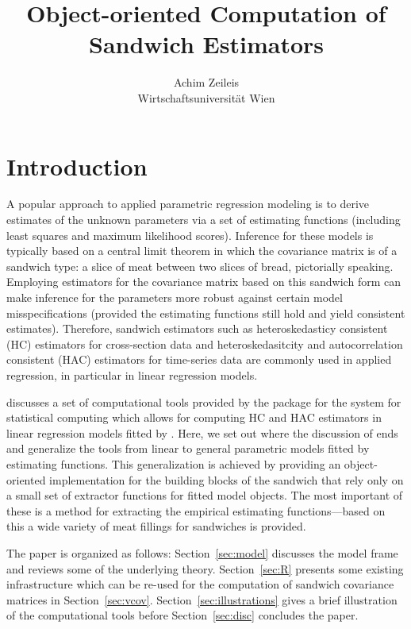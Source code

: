 \documentclass{Z}
\author{Achim Zeileis\\Wirtschaftsuniversit\"at Wien}
\title{Object-oriented Computation of Sandwich Estimators}
\begin{document}


\section{Introduction} \label{sec:intro}

A popular approach to applied parametric regression modeling is to derive estimates
of the unknown parameters via a set of estimating functions (including least squares
and maximum likelihood scores). Inference for these models is typically based on a
central limit theorem in which the covariance matrix is of a sandwich type: a slice
of meat between two slices of bread, pictorially speaking. Employing estimators
for the covariance matrix based on this sandwich form can make inference for the parameters
more robust against certain model misspecifications (provided the estimating
functions still hold and yield consistent estimates). Therefore, sandwich estimators
such as heteroskedasticy consistent (HC) estimators for cross-section data and
heteroskedasitcity and autocorrelation consistent (HAC) estimators for time-series data 
are commonly used in applied regression, in particular in linear regression models.

\cite{hac:Zeileis:2004a} discusses a set of computational tools provided by the
 package for the  system for statistical computing \citep{hac:R:2006}
which allows for computing HC and HAC estimators in linear regression models fitted 
by . Here, we set out where the discussion of \cite{hac:Zeileis:2004a} ends
and generalize the tools from linear to general parametric models fitted by estimating
functions. This generalization is achieved by providing an object-oriented implementation
for the building blocks of the sandwich that rely only on a small set of extractor
functions for fitted model objects. The most important of these is a method for
extracting the empirical estimating functions---based on this a wide variety of 
meat fillings for sandwiches is provided.

The paper is organized as follows: Section~\ref{sec:model} discusses the model frame
and reviews some of the underlying theory. Section~\ref{sec:R} presents some existing
 infrastructure which can be re-used for the computation of sandwich 
covariance matrices in Section~\ref{sec:vcov}. Section~\ref{sec:illustrations} gives
a brief illustration of the computational tools before Section~\ref{sec:disc}
concludes the paper.
\end{document}
